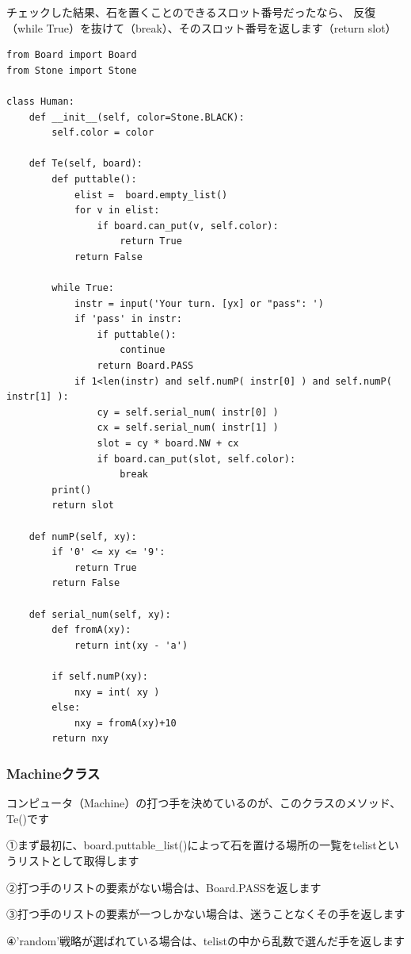 \documentclass[uplatex,a4paper,11pt,oneside,openany]{jsbook}
\begin{document}
チェックした結果、石を置くことのできるスロット番号だったなら、
反復（while True）を抜けて（break）、そのスロット番号を返します（return slot）

\begin{lstlisting}[caption=Human class,label=othello03]
from Board import Board
from Stone import Stone

class Human:
    def __init__(self, color=Stone.BLACK):
        self.color = color

    def Te(self, board):
        def puttable():
            elist =  board.empty_list()
            for v in elist:
                if board.can_put(v, self.color):
                    return True
            return False

        while True:
            instr = input('Your turn. [yx] or "pass": ')
            if 'pass' in instr:
                if puttable():
                    continue
                return Board.PASS
            if 1<len(instr) and self.numP( instr[0] ) and self.numP( instr[1] ):
                cy = self.serial_num( instr[0] )
                cx = self.serial_num( instr[1] )
                slot = cy * board.NW + cx
                if board.can_put(slot, self.color):
                    break
        print()
        return slot

    def numP(self, xy):
        if '0' <= xy <= '9':
            return True
        return False

    def serial_num(self, xy):
        def fromA(xy):
            return int(xy - 'a')

        if self.numP(xy):
            nxy = int( xy )
        else:
            nxy = fromA(xy)+10
        return nxy
\end{lstlisting}

\subsubsection{Machineクラス}

コンピュータ（Machine）の打つ手を決めているのが、このクラスのメソッド、Te()です

①まず最初に、board.puttable\_list()によって石を置ける場所の一覧をtelistというリストとして取得します

②打つ手のリストの要素がない場合は、Board.PASSを返します

③打つ手のリストの要素が一つしかない場合は、迷うことなくその手を返します

④'random'戦略が選ばれている場合は、telistの中から乱数で選んだ手を返します
\end{document}
